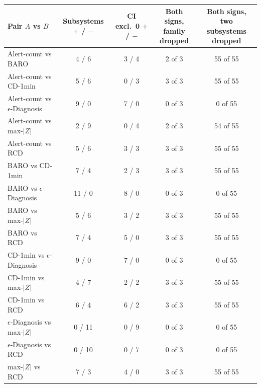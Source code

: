 \setlength{\tabcolsep}{5pt}
\begin{tabular}{@{}lcccc@{}}
\toprule
Pair $A$ vs $B$ & \shortstack{Subsystems\\$+$ / $-$} & \shortstack{CI excl.\ 0\\$+$ / $-$} & \shortstack{Both signs,\\family dropped} & \shortstack{Both signs,\\two subsystems dropped} \\
\midrule
Alert-count vs BARO & 4 / 6 & 3 / 4 & 2 of 3 & 55 of 55 \\
Alert-count vs CD-1min & 5 / 6 & 0 / 3 & 3 of 3 & 55 of 55 \\
Alert-count vs $\epsilon$-Diagnosis & 9 / 0 & 7 / 0 & 0 of 3 & 0 of 55 \\
Alert-count vs max-$|Z|$ & 2 / 9 & 0 / 4 & 2 of 3 & 54 of 55 \\
Alert-count vs RCD & 5 / 6 & 3 / 3 & 3 of 3 & 55 of 55 \\
BARO vs CD-1min & 7 / 4 & 2 / 3 & 3 of 3 & 55 of 55 \\
BARO vs $\epsilon$-Diagnosis & 11 / 0 & 8 / 0 & 0 of 3 & 0 of 55 \\
BARO vs max-$|Z|$ & 5 / 6 & 3 / 2 & 3 of 3 & 55 of 55 \\
BARO vs RCD & 7 / 4 & 5 / 0 & 3 of 3 & 55 of 55 \\
CD-1min vs $\epsilon$-Diagnosis & 9 / 0 & 7 / 0 & 0 of 3 & 0 of 55 \\
CD-1min vs max-$|Z|$ & 4 / 7 & 2 / 2 & 3 of 3 & 55 of 55 \\
CD-1min vs RCD & 6 / 4 & 6 / 2 & 3 of 3 & 55 of 55 \\
$\epsilon$-Diagnosis vs max-$|Z|$ & 0 / 11 & 0 / 9 & 0 of 3 & 0 of 55 \\
$\epsilon$-Diagnosis vs RCD & 0 / 10 & 0 / 7 & 0 of 3 & 0 of 55 \\
max-$|Z|$ vs RCD & 7 / 3 & 4 / 0 & 3 of 3 & 55 of 55 \\
\bottomrule
\end{tabular}
